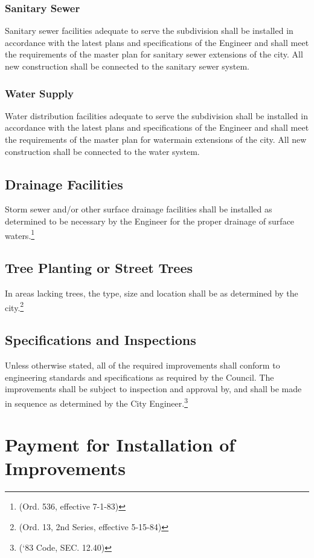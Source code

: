 \subsubsection{Sanitary Sewer}
Sanitary sewer facilities adequate to serve the subdivision shall be installed in accordance with the latest plans and specifications of the Engineer and shall meet the requirements of the master plan for sanitary sewer extensions of the city. All new construction shall be connected to the sanitary sewer system.
\subsubsection{Water Supply}
Water distribution facilities adequate to serve the subdivision shall be installed in accordance with the latest plans and specifications of the Engineer and shall meet the requirements of the master plan for watermain extensions of the city. All new construction shall be connected to the water system.
\subsection{Drainage Facilities}
Storm sewer and/or other surface drainage facilities shall be installed as determined to be necessary by the Engineer for the proper drainage of surface waters.\footnote{(Ord. 536, effective 7-1-83)}
\subsection{Tree Planting or Street Trees}
In areas lacking trees, the type, size and location shall be as determined by the city.\footnote{(Ord. 13, 2nd Series, effective 5-15-84)}
\subsection{Specifications and Inspections}
Unless otherwise stated, all of the required improvements shall conform to engineering standards and specifications as required by the Council. The improvements shall be subject to inspection and approval by, and shall be made in sequence as determined by the City Engineer.\footnote{(‘83 Code, SEC. 12.40)}

\section{Payment for Installation of Improvements}
